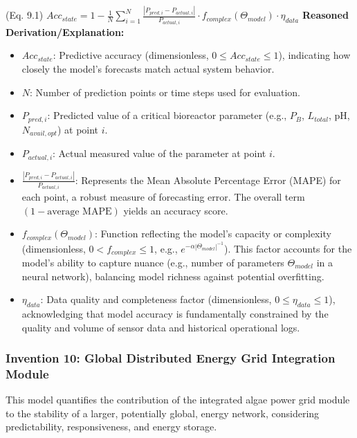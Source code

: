 \documentclass{article}
\newenvironment{reasonedderivation}{
    \textbf{Reasoned Derivation/Explanation:}
    \begin{itemize}
}{
    \end{itemize}
}
\begin{document}
(Eq. 9.1) $Acc_{state} = 1 - \frac{1}{N} \sum_{i=1}^{N} \frac{|P_{pred,i} - P_{actual,i}|}{P_{actual,i}} \cdot f_{complex}(\Theta_{model}) \cdot \eta_{data}$
\begin{reasonedderivation}
    \item $Acc_{state}$: Predictive accuracy (dimensionless, $0 \le Acc_{state} \le 1$), indicating how closely the model's forecasts match actual system behavior.
    \item $N$: Number of prediction points or time steps used for evaluation.
    \item $P_{pred,i}$: Predicted value of a critical bioreactor parameter (e.g., $P_B$, $L_{total}$, pH, $N_{avail, opt}$) at point $i$.
    \item $P_{actual,i}$: Actual measured value of the parameter at point $i$.
    \item $\frac{|P_{pred,i} - P_{actual,i}|}{P_{actual,i}}$: Represents the Mean Absolute Percentage Error (MAPE) for each point, a robust measure of forecasting error. The overall term $(1 - \text{average MAPE})$ yields an accuracy score.
    \item $f_{complex}(\Theta_{model})$: Function reflecting the model's capacity or complexity (dimensionless, $0 < f_{complex} \le 1$, e.g., $e^{-\alpha |\Theta_{model}|^{-1}}$). This factor accounts for the model's ability to capture nuance (e.g., number of parameters $\Theta_{model}$ in a neural network), balancing model richness against potential overfitting.
    \item $\eta_{data}$: Data quality and completeness factor (dimensionless, $0 \le \eta_{data} \le 1$), acknowledging that model accuracy is fundamentally constrained by the quality and volume of sensor data and historical operational logs.
\end{reasonedderivation}

\subsubsection*{Invention 10: Global Distributed Energy Grid Integration Module}
This model quantifies the contribution of the integrated algae power grid module to the stability of a larger, potentially global, energy network, considering predictability, responsiveness, and energy storage.
\end{document}
